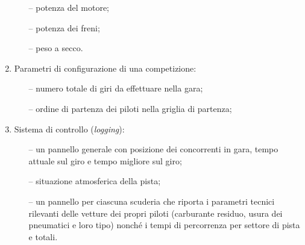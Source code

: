 \documentclass[11pt,a4paper]{report}
\begin{document}
\begin{enumerate}
\begin{itemize}
        \item[--] potenza del motore;
        \item[--] potenza dei freni;
        \item[--] peso a secco.
    \end{itemize}
    \item Parametri di configurazione di una competizione:
    \begin{itemize}
        \item[--] numero totale di giri da effettuare nella gara;
	\item[--] ordine di partenza dei piloti nella griglia di partenza;
    \end{itemize}
    \item Sistema di controllo (\textit{logging}):
    \begin{itemize}
        \item[--] un pannello generale con posizione dei concorrenti in gara, tempo attuale sul giro e tempo migliore sul giro;
        \item[--] situazione atmosferica della pista;
        \item[--] un pannello per ciascuna scuderia che riporta i parametri tecnici rilevanti delle vetture dei propri piloti (carburante residuo, usura dei pneumatici e loro tipo) nonché i tempi di percorrenza per settore di pista e totali.
    \end{itemize}
\end{enumerate}




\end{document}
